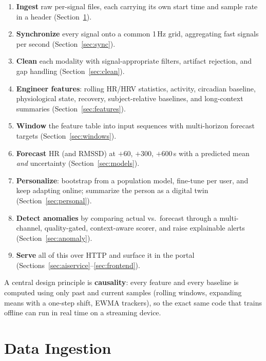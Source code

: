 \documentclass[11pt,a4paper]{article}
\begin{document}
\begin{enumerate}[leftmargin=1.4em,itemsep=2pt]
\item \textbf{Ingest} raw per-signal files, each carrying its own start time and
      sample rate in a header (Section~\ref{sec:ingest}).
\item \textbf{Synchronize} every signal onto a common 1\,Hz grid, aggregating
      fast signals per second (Section~\ref{sec:sync}).
\item \textbf{Clean} each modality with signal-appropriate filters, artifact
      rejection, and gap handling (Section~\ref{sec:clean}).
\item \textbf{Engineer features}: rolling HR/HRV statistics, activity, circadian
      baseline, physiological state, recovery, subject-relative baselines, and
      long-context summaries (Section~\ref{sec:features}).
\item \textbf{Window} the feature table into input sequences with multi-horizon
      forecast targets (Section~\ref{sec:windows}).
\item \textbf{Forecast} HR (and RMSSD) at $+60$, $+300$, $+600$\,s with a
      predicted mean \emph{and} uncertainty (Section~\ref{sec:models}).
\item \textbf{Personalize}: bootstrap from a population model, fine-tune per
      user, and keep adapting online; summarize the person as a digital twin
      (Section~\ref{sec:personal}).
\item \textbf{Detect anomalies} by comparing actual vs.\ forecast through a
      multi-channel, quality-gated, context-aware scorer, and raise explainable
      alerts (Section~\ref{sec:anomaly}).
\item \textbf{Serve} all of this over HTTP and surface it in the portal
      (Sections~\ref{sec:aiservice}--\ref{sec:frontend}).
\end{enumerate}

A central design principle is \textbf{causality}: every feature and every
baseline is computed using only past and current samples (rolling windows,
expanding means with a one-step shift, EWMA trackers), so the exact same code
that trains offline can run in real time on a streaming device.

\section{Data Ingestion}\label{sec:ingest}
\end{document}
